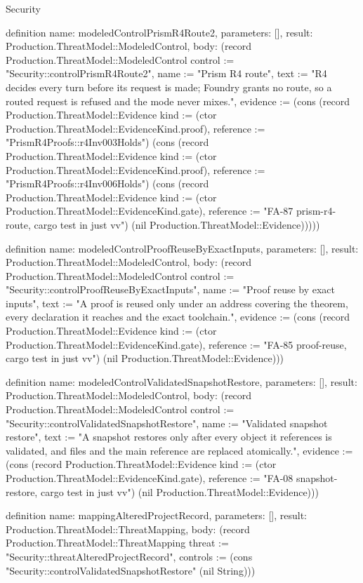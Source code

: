 \begin{lexlean}{Security}
\begin{semanticmodule}
definition{
  name: modeledControlPrismR4Route2,
  parameters: [],
  result: Production.ThreatModel::ModeledControl,
  body: (record Production.ThreatModel::ModeledControl {control := "Security::controlPrismR4Route2", name := "Prism R4 route", text := "R4 decides every turn before its request is made; Foundry grants no route, so a routed request is refused and the mode never mixes.", evidence := (cons (record Production.ThreatModel::Evidence {kind := (ctor Production.ThreatModel::EvidenceKind.proof), reference := "PrismR4Proofs::r4Inv003Holds"}) (cons (record Production.ThreatModel::Evidence {kind := (ctor Production.ThreatModel::EvidenceKind.proof), reference := "PrismR4Proofs::r4Inv006Holds"}) (cons (record Production.ThreatModel::Evidence {kind := (ctor Production.ThreatModel::EvidenceKind.gate), reference := "FA-87 prism-r4-route, cargo test in just vv"}) (nil Production.ThreatModel::Evidence))))})
}

definition{
  name: modeledControlProofReuseByExactInputs,
  parameters: [],
  result: Production.ThreatModel::ModeledControl,
  body: (record Production.ThreatModel::ModeledControl {control := "Security::controlProofReuseByExactInputs", name := "Proof reuse by exact inputs", text := "A proof is reused only under an address covering the theorem, every declaration it reaches and the exact toolchain.", evidence := (cons (record Production.ThreatModel::Evidence {kind := (ctor Production.ThreatModel::EvidenceKind.gate), reference := "FA-85 proof-reuse, cargo test in just vv"}) (nil Production.ThreatModel::Evidence))})
}

definition{
  name: modeledControlValidatedSnapshotRestore,
  parameters: [],
  result: Production.ThreatModel::ModeledControl,
  body: (record Production.ThreatModel::ModeledControl {control := "Security::controlValidatedSnapshotRestore", name := "Validated snapshot restore", text := "A snapshot restores only after every object it references is validated, and files and the main reference are replaced atomically.", evidence := (cons (record Production.ThreatModel::Evidence {kind := (ctor Production.ThreatModel::EvidenceKind.gate), reference := "FA-08 snapshot-restore, cargo test in just vv"}) (nil Production.ThreatModel::Evidence))})
}

definition{
  name: mappingAlteredProjectRecord,
  parameters: [],
  result: Production.ThreatModel::ThreatMapping,
  body: (record Production.ThreatModel::ThreatMapping {threat := "Security::threatAlteredProjectRecord", controls := (cons "Security::controlValidatedSnapshotRestore" (nil String))})
}


\end{semanticmodule}
\end{lexlean}
